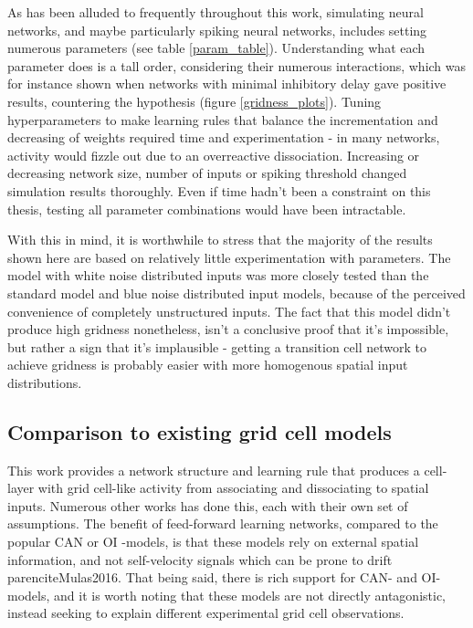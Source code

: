 \documentclass{article}
\begin{document}
    As has been alluded to frequently throughout this work, simulating neural networks, and maybe particularly spiking neural networks, includes setting numerous parameters (see table \ref{param_table}). Understanding what each parameter does is a tall order, considering their numerous interactions, which was for instance shown when networks with minimal inhibitory delay gave positive results, countering the hypothesis (figure \ref{gridness_plots}). Tuning hyperparameters to make learning rules that balance the incrementation and decreasing of weights required time and experimentation - in many networks, activity would fizzle out due to an overreactive dissociation. Increasing or decreasing network size, number of inputs or spiking threshold changed simulation results thoroughly. Even if time hadn't been a constraint on this thesis, testing all parameter combinations would have been intractable.

    With this in mind, it is worthwhile to stress that the majority of the results shown here are based on relatively little experimentation with parameters. The model with white noise distributed inputs was more closely tested than the standard model and blue noise distributed input models, because of the perceived convenience of completely unstructured inputs. The fact that this model didn't produce high gridness nonetheless, isn't a conclusive proof that it's impossible, but rather a sign that it's implausible - getting a transition cell network to achieve gridness is probably easier with more homogenous spatial input distributions. 

    \subsection{Comparison to existing grid cell models} \label{Other model comparisons}

    This work provides a network structure and learning rule that produces a cell-layer with grid cell-like activity from associating and dissociating to spatial inputs. Numerous other works has done this, each with their own set of assumptions. The benefit of feed-forward learning networks, compared to the popular CAN or OI -models, is that these models rely on external spatial information, and not self-velocity signals which can be prone to drift parencite{Mulas2016}. That being said, there is rich support for CAN- and OI-models, and it is worth noting that these models are not directly antagonistic, instead seeking to explain different experimental grid cell observations.
\end{document}
